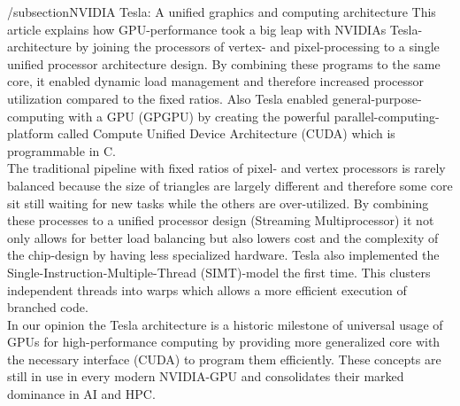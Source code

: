 /subsection{NVIDIA Tesla: A unified graphics and computing architecture}
This article explains how GPU-performance took a big leap with NVIDIAs Tesla-architecture by joining the processors of vertex- and pixel-processing to a single unified processor architecture design. By combining these programs to the same core, it enabled dynamic load management and therefore increased processor utilization compared to the fixed ratios. Also Tesla enabled general-purpose-computing with a GPU (GPGPU) by creating the powerful parallel-computing-platform called Compute Unified Device Architecture (CUDA) which is programmable in C.\\
The traditional pipeline with fixed ratios of pixel- and vertex processors is rarely balanced because the size of triangles are largely different and therefore some core sit still waiting for new tasks while the others are over-utilized. By combining these processes to a unified processor design (Streaming Multiprocessor) it not only allows for better load balancing but also lowers cost and the complexity of the chip-design by having less specialized hardware. Tesla also implemented the Single-Instruction-Multiple-Thread (SIMT)-model the first time. This clusters independent threads into warps which allows a more efficient execution of branched code.\\
In our opinion the Tesla architecture is a historic milestone of universal usage of GPUs for high-performance computing by providing more generalized core with the necessary interface (CUDA) to program them efficiently. These concepts are still in use in every modern NVIDIA-GPU and consolidates their marked dominance in AI and HPC.